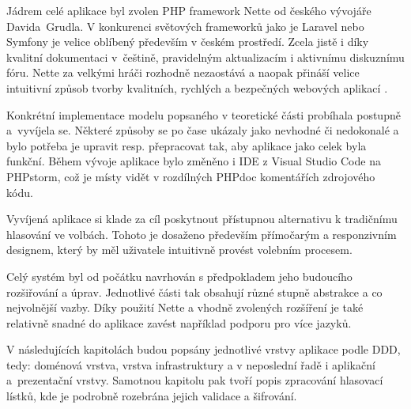 

\label{section:pozadavkyCele}



Jádrem celé aplikace byl zvolen PHP framework Nette od českého vývojáře Davida~Grudla. 
V konkurenci světových frameworků jako je Laravel nebo Symfony je velice oblíbený především v českém prostředí. Zcela jistě i díky kvalitní dokumentaci v~češtině, pravidelným aktualizacím i aktivnímu diskuznímu fóru. 
Nette za velkými hráči rozhodně nezaostává a naopak přináší velice intuitivní způsob tvorby kvalitních, rychlých a bezpečných webových aplikací \cite{Haska2016}.




{}


{}\label{section:DDD}

\clearpage
{}\label{section:Entity}




Konkrétní implementace modelu popsaného v teoretické části probíhala postupně a~vyvíjela se. Některé způsoby se po čase ukázaly jako nevhodné či nedokonalé a bylo potřeba je upravit resp. přepracovat tak, aby aplikace jako celek byla funkční. Během vývoje aplikace bylo změněno i IDE z Visual Studio Code na PHPstorm, což je místy vidět v rozdílných PHPdoc komentářích zdrojového kódu.

\bigskip

Vyvíjená aplikace si klade za cíl poskytnout přístupnou alternativu k tradičnímu hlasování ve volbách. Tohoto je dosaženo především přímočarým a responzivním designem, který by měl uživatele intuitivně provést volebním procesem.

Celý systém byl od počátku navrhován s předpokladem jeho budoucího rozšiřování a úprav. Jednotlivé části tak obsahují různé stupně abstrakce a co nejvolnější vazby. Díky použití Nette a vhodně zvolených rozšíření je také relativně snadné do aplikace zavést například podporu pro více jazyků.

\bigskip

V následujících kapitolách budou popsány jednotlivé vrstvy aplikace podle DDD, tedy: doménová vrstva, vrstva infrastruktury a v neposlední řadě i aplikační a~prezentační vrstvy.  Samotnou kapitolu pak tvoří popis zpracování hlasovací lístků, kde je podrobně rozebrána jejich validace a šifrování.

